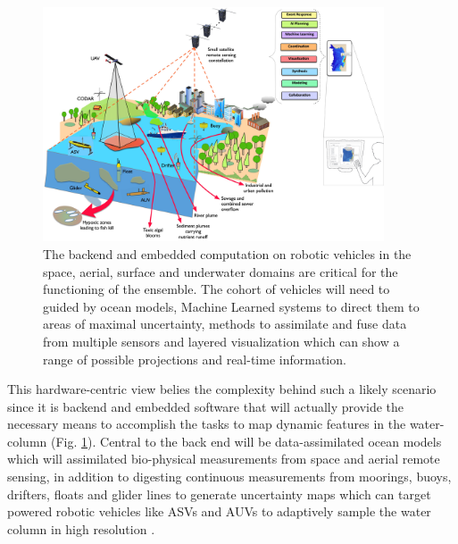 \begin{figure}[!h]
  \centering
  \includegraphics[width=0.9\textwidth]{fig/inverse-pyramid-2.jpg}
  \caption{The backend and embedded computation on robotic vehicles in
  the space, aerial, surface and underwater domains are critical for
  the functioning of the ensemble. The cohort of vehicles will need to
  guided by ocean models, Machine Learned systems to direct them to
  areas of maximal uncertainty, methods to assimilate and fuse data
  from multiple sensors and layered visualization which can show a
  range of possible projections and real-time information.}
  \label{fig:inverse-2}
\end{figure}

This hardware-centric view belies the complexity behind such a likely
scenario since it is backend and embedded software that will actually
provide the necessary means to accomplish the tasks to map dynamic
features in the water-column (Fig. \ref{fig:inverse-2}). Central to
the back end will be data-assimilated ocean models which will
assimilated bio-physical measurements from space and aerial remote
sensing, in addition to digesting continuous measurements from
moorings, buoys, drifters, floats and glider lines to generate
uncertainty maps which can target powered robotic vehicles like ASVs
and AUVs to adaptively sample the water column in high resolution
\cite{berget18,fossum18,fossum18b,fossum19b,fossum21}.



